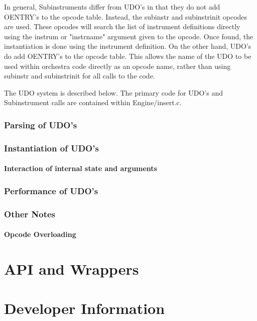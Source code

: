 \documentclass[]{book}
\begin{document}
In general, Subinstruments differ from UDO's in that they do not add OENTRY's to the opcode table.  Instead, the subinstr and subinstrinit opcodes are used.  These opcodes will search the list of instrument definitions directly using the instrum or "instrname" argument given to the opcode. Once found, the instantiation is done using the instrument definition.  On the other hand, UDO's do add OENTRY's to the opcode table. This allows the name of the UDO to be used within orchestra code directly as an opcode name, rather than using subinstr and subinstrinit for all calls to the code.

The UDO system is described below. The primary code for UDO's and Subinstrument calls are contained within Engine/insert.c.

\subsection{Parsing of UDO's}

\subsection{Instantiation of UDO's}

\subsubsection{Interaction of internal state and arguments}

\subsection{Performance of UDO's}

\subsection{Other Notes}

\subsubsection{Opcode Overloading}


\chapter{API and Wrappers}



\chapter{Developer Information}
\end{document}
